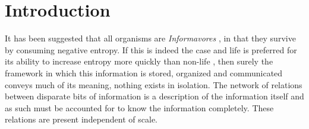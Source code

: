 

\graphicspath{{1_introduction/figures/}} %





\setcounter{page}{1}
\chapter{Introduction} 

It has been suggested that all organisms are \emph{Informavores} \citep{MARGALEF1996141}, in that they survive by consuming negative entropy. If this is indeed the case and life is preferred for its ability to increase entropy more quickly than non-life \citep{england2013statistical}, then surely the framework in which this information is stored, organized and communicated conveys much of its meaning, \ie nothing exists in isolation. The network of relations between disparate bits of information is a description of the information itself and as such must be accounted for to know the information completely. These relations are present independent of scale.

